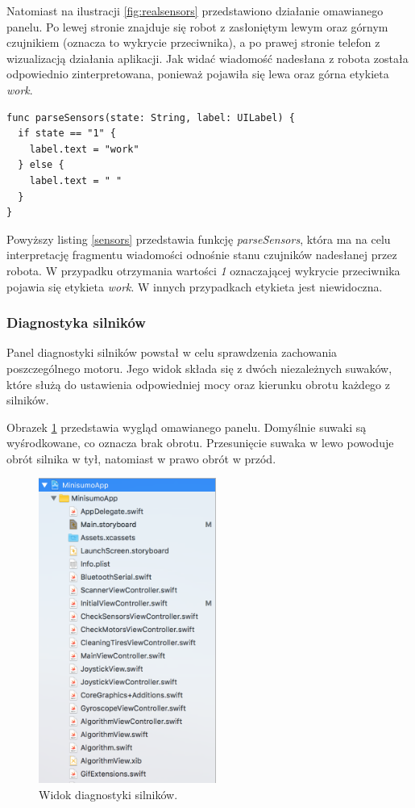 Natomiast na ilustracji \ref{fig:realsensors} przedstawiono działanie omawianego panelu. Po lewej stronie znajduje się robot z zasłoniętym lewym oraz górnym czujnikiem (oznacza to wykrycie przeciwnika), a po prawej stronie telefon z wizualizacją działania aplikacji. Jak widać wiadomość nadesłana z robota została odpowiednio zinterpretowana, ponieważ pojawiła się lewa oraz górna etykieta \textit{work}.

\begin{minipage}{\textwidth}
	\begin{lstlisting}[label=sensors,caption=Parsowanie wiadomości zawierającej stan czujników.]
func parseSensors(state: String, label: UILabel) {
  if state == "1" {
    label.text = "work"
  } else {
    label.text = " "
  }
}
	\end{lstlisting}
\end{minipage}

Powyższy listing \ref{sensors} przedstawia funkcję \textit{parseSensors}, która ma na celu interpretację fragmentu wiadomości odnośnie stanu czujników nadesłanej przez robota. W przypadku otrzymania wartości \textit{1} oznaczającej wykrycie przeciwnika pojawia się etykieta \textit{work}. W innych przypadkach etykieta jest niewidoczna.
 
\subsubsection{Diagnostyka silników}
Panel diagnostyki silników powstał w celu sprawdzenia zachowania poszczególnego motoru. Jego widok składa się z dwóch niezależnych suwaków, które służą do ustawienia odpowiedniej mocy oraz kierunku obrotu każdego z silników.

Obrazek \ref{fig:motors} przedstawia wygląd omawianego panelu. Domyślnie suwaki są wyśrodkowane, co oznacza brak obrotu. Przesunięcie suwaka w lewo powoduje obrót silnika w tył, natomiast w prawo obrót w przód.

\begin{figure}[H]
	\centering
		\includegraphics[width=0.75\linewidth, height=10cm, keepaspectratio]{pic05/structure.png}
	\caption{Widok diagnostyki silników.}
	\label{fig:motors}	
\end{figure}



